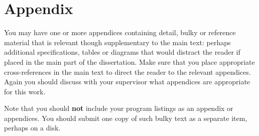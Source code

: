 \chapter*{Appendix}
You may have one or more appendices containing detail, bulky or reference material that is relevant though supplementary to the main text: perhaps additional specifications, tables or diagrams that would distract the reader if placed in the main part of the dissertation. Make sure that you place appropriate cross-references in the main text to direct the reader to the relevant appendices.
Again you should discuss with your supervisor what appendices are appropriate for this work.

Note that you should {\bf not} include your program listings as an appendix or appendices. You should submit one copy of such bulky text as a separate item, perhaps on a disk.
